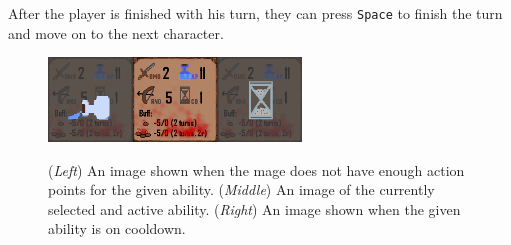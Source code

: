 After the player is finished with his turn, they can press \verb|Space| to finish the turn and move on to the next character.

\begin{figure}
	\centering
	\includegraphics[width=0.60\textwidth]{img/cooldown-no-ap.png}
	\label{fig:cooldown-no-ap}
	\caption{(\emph{Left}) An image shown when the mage does not have enough action points for the given ability. (\emph{Middle}) An image of the currently selected and active ability. (\emph{Right}) An image shown when the given ability is on cooldown.}
\end{figure}